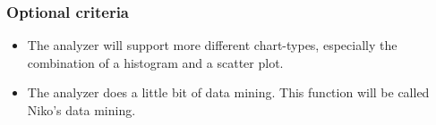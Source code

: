 \subsubsection{Optional criteria}
\begin{itemize}
\item The analyzer will support more different chart-types, especially the combination of
a histogram and a scatter plot. 
\item The analyzer does a little bit of data mining. This function will 
be called Niko's data mining.
\end{itemize}






